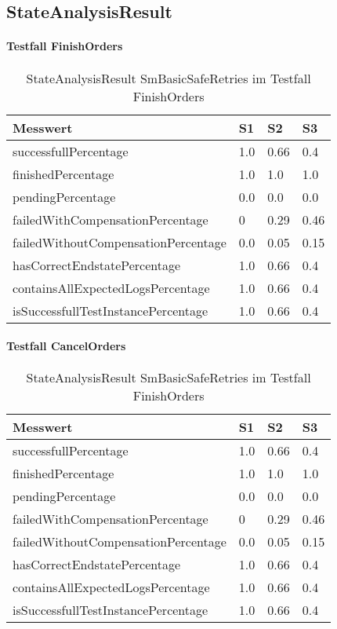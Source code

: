 \subsection{StateAnalysisResult}

\paragraph*{Testfall FinishOrders}
\begin{center}
	\fontsize{9}{12}\selectfont
	\begin{longtable}[h]{|p{5cm}|p{1cm}|p{1cm}|p{1cm}|}
		\hline
		Messwert & S1 & S2 & S3 \\ \hline
		\endhead
		\caption{StateAnalysisResult SmBasicSafeRetries im Testfall FinishOrders}
		\label{tab:smbasicsaferetries_stateanalysisresult_finishorders}
		\endfoot
		successfull\-Percentage & 1.0 & 0.66 & 0.4 \\ \hline
		finished\-Percentage & 1.0 & 1.0 & 1.0 \\ \hline
		pending\-Percentage & 0.0 & 0.0 & 0.0 \\ \hline
		failedWithCompensation\-Percentage & 0 & 0.29 & 0.46 \\ \hline
		failedWithoutCompensation\-Percentage & 0.0 & 0.05 & 0.15 \\ \hline
		hasCorrectEndstate\-Percentage & 1.0 & 0.66 & 0.4 \\ \hline
		containsAllExpectedLogs\-Percentage & 1.0 & 0.66 & 0.4 \\ \hline
		isSuccessfullTestInstance\-Percentage & 1.0 & 0.66 & 0.4 \\ \hline
	\end{longtable}
\end{center}
\FloatBarrier

\paragraph*{Testfall CancelOrders}
\begin{center}
	\fontsize{9}{12}\selectfont
	\begin{longtable}[h]{|p{5cm}|p{1cm}|p{1cm}|p{1cm}|}
		\hline
		Messwert & S1 & S2 & S3 \\ \hline
		\endhead
		\caption{StateAnalysisResult SmBasicSafeRetries im Testfall FinishOrders}
		\label{tab:smbasicsaferetries_stateanalysisresult_cancelorders}
		\endfoot
		successfull\-Percentage & 1.0 & 0.66 & 0.4 \\ \hline
		finished\-Percentage & 1.0 & 1.0 & 1.0 \\ \hline
		pending\-Percentage & 0.0 & 0.0 & 0.0 \\ \hline
		failedWithCompensation\-Percentage & 0 & 0.29 & 0.46 \\ \hline
		failedWithoutCompensation\-Percentage & 0.0 & 0.05 & 0.15 \\ \hline
		hasCorrectEndstate\-Percentage & 1.0 & 0.66 & 0.4 \\ \hline
		containsAllExpectedLogs\-Percentage & 1.0 & 0.66 & 0.4 \\ \hline
		isSuccessfullTestInstance\-Percentage & 1.0 & 0.66 & 0.4 \\ \hline
	\end{longtable}
\end{center}
\FloatBarrier